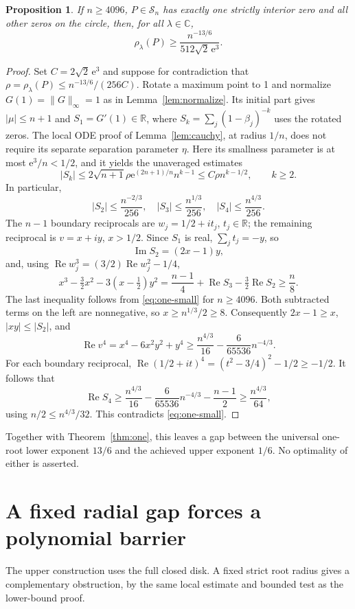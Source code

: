 \documentclass[11pt]{article}
\newtheorem{proposition}[theorem]{Proposition}
\theoremstyle{remark}\newtheorem{remark}[theorem]{Remark}
\newcommand{\C}{\mathbb C}
\newcommand{\norm}[1]{\lVert #1\rVert}
\newcommand{\Rea}{\operatorname{Re}}
\newcommand{\ee}{\mathrm e}
\begin{document}
\begin{proposition}\label{prop:one-lower}
If \(n\ge4096\), \(P\in\mathcal S_n\) has exactly one strictly
interior zero and all other zeros on the circle, then, for all
\(\lambda\in\C\),
\[
 \rho_\lambda(P)\ge\frac{n^{-13/6}}{512\sqrt2\,\ee^3}.
\]
\end{proposition}
\begin{proof}
Set \(C=2\sqrt2\,\ee^3\) and suppose for contradiction that
\(\rho=\rho_\lambda(P)\le n^{-13/6}/(256C)\).
Rotate a maximum point to 1 and normalize \(G(1)=\norm G_\infty=1\)
as in Lemma~\ref{lem:normalize}. Its initial part gives
\(|\mu|\le n+1\) and \(S_1=G'(1)\in\mathbb R\), where
\(S_k=\sum_j(1-\beta_j)^{-k}\) uses the rotated zeros.
The local ODE proof of Lemma~\ref{lem:cauchy}, at radius \(1/n\),
does not require its separate separation parameter \(\eta\).
Here its smallness parameter is at most \(\ee^3/n<1/2\), and
it yields the unaveraged estimates
\[
 |S_k|\le2\sqrt{n+1}\rho\ee^{(2n+1)/n}n^{k-1}
       \le C\rho n^{k-1/2},\qquad k\ge2.
\]
In particular,
\begin{equation}\label{eq:one-small}
 |S_2|\le\frac{n^{-2/3}}{256},\quad
 |S_3|\le\frac{n^{1/3}}{256},\quad
 |S_4|\le\frac{n^{4/3}}{256}.
\end{equation}
The \(n-1\) boundary reciprocals are \(w_j=1/2+it_j\),
\(t_j\in\mathbb R\); the remaining reciprocal is \(v=x+iy\),
\(x>1/2\). Since \(S_1\) is real, \(\sum_jt_j=-y\), so
\[
 \operatorname{Im}S_2=(2x-1)y,
\]
and, using \(\Rea w_j^3=(3/2)\Rea w_j^2-1/4\),
\[
 x^3-\tfrac32x^2-3(x-\tfrac12)y^2
   =\frac{n-1}{4}+\Rea S_3-\tfrac32\Rea S_2\ge\frac n8.
\]
The last inequality follows from \eqref{eq:one-small} for
\(n\ge4096\). Both subtracted terms on the left are nonnegative,
so \(x\ge n^{1/3}/2\ge8\). Consequently
\(2x-1\ge x\), \(|xy|\le|S_2|\), and
\[
 \Rea v^4=x^4-6x^2y^2+y^4
 \ge\frac{n^{4/3}}{16}-\frac6{65536}n^{-4/3}.
\]
For each boundary reciprocal,
\(\Rea(1/2+it)^4=(t^2-3/4)^2-1/2\ge-1/2\).
It follows that
\[
 \Rea S_4\ge\frac{n^{4/3}}{16}
              -\frac6{65536}n^{-4/3}-\frac{n-1}{2}
            \ge\frac{n^{4/3}}{64},
\]
using \(n/2\le n^{4/3}/32\). This contradicts
\eqref{eq:one-small}.
\end{proof}

Together with Theorem~\ref{thm:one}, this leaves a gap between
the universal one-root lower exponent \(13/6\) and the achieved
upper exponent \(1/6\). No optimality of either is asserted.

\section{A fixed radial gap forces a polynomial barrier}\label{sec:radial}
The upper construction uses the full closed disk. A fixed strict
root radius gives a complementary obstruction, by the same local
estimate and bounded test as the lower-bound proof.
\end{document}
